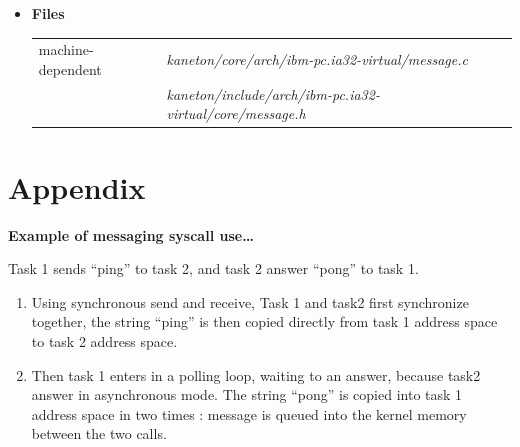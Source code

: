 \begin{itemize}
  \item {\bf {Files}}\\

    \begin{tabular}{| l | l |}
      \hline
      machine-dependent & {\em kaneton/core/arch/ibm-pc.ia32-virtual/message.c}\\
      & {\em kaneton/include/arch/ibm-pc.ia32-virtual/core/message.h}\\\hline
    \end{tabular}

\end{itemize}

%
%

\newpage

\section{Appendix}

\textbf{Example of messaging syscall use\ldots}

Task 1 sends ``ping'' to task 2, and task 2 answer ``pong'' to task 1.

\begin{enumerate}
  \item Using synchronous send and receive, Task 1 and task2 first
  synchronize together, the string ``ping'' is then copied directly from task 1
  address space to task 2 address space.

  \item	Then task 1 enters in a polling loop, waiting to an answer, because
  task2 answer in asynchronous mode. The string ``pong'' is copied into task 1
  address space in two times : message is queued into the kernel memory between
  the two calls.
\end{enumerate}

